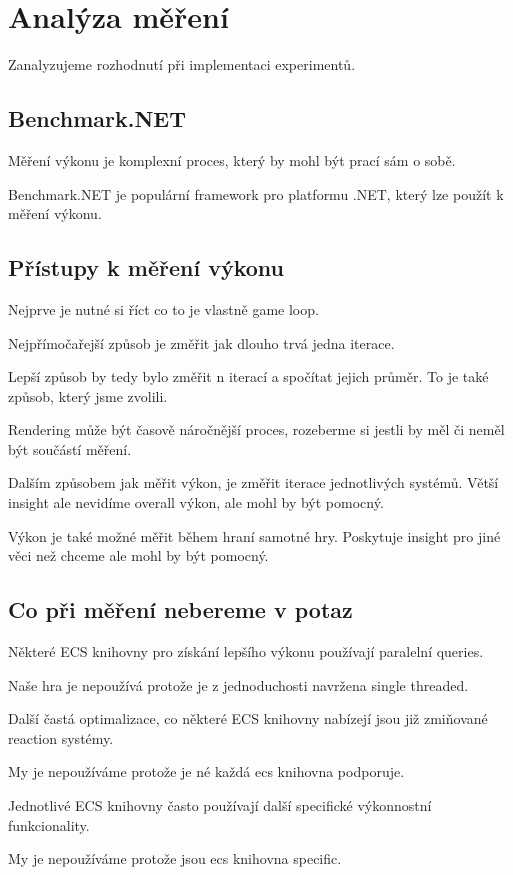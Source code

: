 \chapter{Analýza měření}
Zanalyzujeme rozhodnutí při implementaci experimentů.

\section{Benchmark.NET}
Měření výkonu je komplexní proces, který by mohl být prací sám o sobě.

Benchmark.NET je populární framework pro platformu .NET, který lze použít k měření výkonu.

\section{Přístupy k měření výkonu}

Nejprve je nutné si říct co to je vlastně game loop.

Nejpřímočařejší způsob je změřit jak dlouho trvá jedna iterace.

Lepší způsob by tedy bylo změřit n iterací a spočítat jejich průměr. To je také způsob, který jsme zvolili.

Rendering může být časově náročnější proces, rozeberme si jestli by měl či neměl být součástí měření.

Dalším způsobem jak měřit výkon, je změřit iterace jednotlivých systémů. Větší insight ale nevidíme overall výkon, ale mohl by být pomocný.

Výkon je také možné měřit během hraní samotné hry. Poskytuje insight pro jiné věci než chceme ale mohl by být pomocný.

\section{Co při měření nebereme v potaz}
Některé ECS knihovny pro získání lepšího výkonu používají paralelní queries.

Naše hra je nepoužívá protože je z jednoduchosti navržena single threaded.

Další častá optimalizace, co některé ECS knihovny nabízejí jsou již zmiňované reaction systémy.

My je nepoužíváme protože je né každá ecs knihovna podporuje.

Jednotlivé ECS knihovny často používají další specifické výkonnostní funkcionality.

My je nepoužíváme protože jsou ecs knihovna specific.

